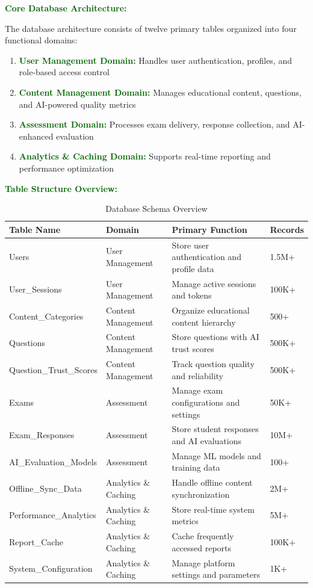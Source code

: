 \documentclass[12pt,a4paper,oneside]{book}
\begin{document}
\textbf{\textcolor{darkgreen}{Core Database Architecture:}}

The database architecture consists of twelve primary tables organized into four functional domains:

\begin{enumerate}
    \item \textbf{\textcolor{darkgreen}{User Management Domain:}} Handles user authentication, profiles, and role-based access control
    \item \textbf{\textcolor{darkgreen}{Content Management Domain:}} Manages educational content, questions, and AI-powered quality metrics
    \item \textbf{\textcolor{darkgreen}{Assessment Domain:}} Processes exam delivery, response collection, and AI-enhanced evaluation
    \item \textbf{\textcolor{darkgreen}{Analytics \& Caching Domain:}} Supports real-time reporting and performance optimization
\end{enumerate}

\textbf{\textcolor{darkgreen}{Table Structure Overview:}}

\begin{table}[H]
\centering
\caption{Database Schema Overview}
\footnotesize
\begin{tabular}{|L{3.5cm}|L{2.5cm}|L{5cm}|L{1.5cm}|}
\hline
\textbf{Table Name} & \textbf{Domain} & \textbf{Primary Function} & \textbf{Records} \\
\hline
Users & User Management & Store user authentication and profile data & 1.5M+ \\
\hline
User\_Sessions & User Management & Manage active sessions and tokens & 100K+ \\
\hline
Content\_Categories & Content Management & Organize educational content hierarchy & 500+ \\
\hline
Questions & Content Management & Store questions with AI trust scores & 500K+ \\
\hline
Question\_Trust\_Scores & Content Management & Track question quality and reliability & 500K+ \\
\hline
Exams & Assessment & Manage exam configurations and settings & 50K+ \\
\hline
Exam\_Responses & Assessment & Store student responses and AI evaluations & 10M+ \\
\hline
AI\_Evaluation\_Models & Assessment & Manage ML models and training data & 100+ \\
\hline
Offline\_Sync\_Data & Analytics \& Caching & Handle offline content synchronization & 2M+ \\
\hline
Performance\_Analytics & Analytics \& Caching & Store real-time system metrics & 5M+ \\
\hline
Report\_Cache & Analytics \& Caching & Cache frequently accessed reports & 100K+ \\
\hline
System\_Configuration & Analytics \& Caching & Manage platform settings and parameters & 1K+ \\
\hline
\end{tabular}
\end{table}
\end{document}
